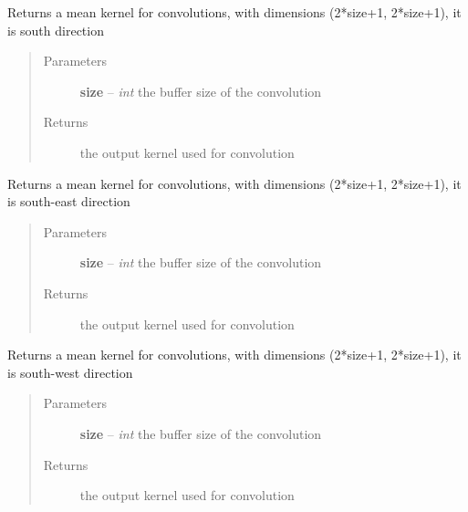\documentclass[letterpaper,10pt,english]{sphinxmanual}
\begin{document}

\begin{fulllineitems}
\label{docs/shielding:shield_mult.kern_s}
Returns a mean kernel for convolutions, with dimensions
(2*size+1, 2*size+1), it is south direction
\begin{quote}\begin{description}
\item[{Parameters}] \leavevmode
\textbf{size} -- \emph{int} the buffer size of the convolution

\item[{Returns}] \leavevmode
{} the output kernel used for convolution

\end{description}\end{quote}

\end{fulllineitems}



\begin{fulllineitems}
\label{docs/shielding:shield_mult.kern_se}
Returns a mean kernel for convolutions, with dimensions
(2*size+1, 2*size+1), it is south-east direction
\begin{quote}\begin{description}
\item[{Parameters}] \leavevmode
\textbf{size} -- \emph{int} the buffer size of the convolution

\item[{Returns}] \leavevmode
{} the output kernel used for convolution

\end{description}\end{quote}

\end{fulllineitems}



\begin{fulllineitems}
\label{docs/shielding:shield_mult.kern_sw}
Returns a mean kernel for convolutions, with dimensions
(2*size+1, 2*size+1), it is south-west direction
\begin{quote}\begin{description}
\item[{Parameters}] \leavevmode
\textbf{size} -- \emph{int} the buffer size of the convolution

\item[{Returns}] \leavevmode
{} the output kernel used for convolution

\end{description}\end{quote}

\end{fulllineitems}
\end{document}
